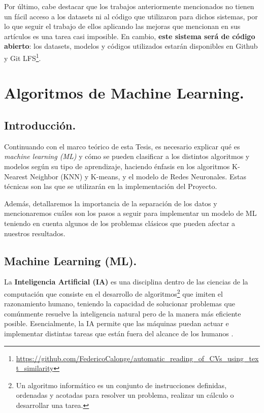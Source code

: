 \documentclass[12pt,a4paper]{article}
\begin{document}
\begin{sloppypar}
Por último, cabe destacar que los trabajos anteriormente mencionados no tienen un fácil acceso a los datasets ni al código que utilizaron para dichos sistemas, por lo que seguir el trabajo de ellos aplicando las mejoras que mencionan en sus artículos es una tarea casi imposible. En cambio, \textbf{este sistema será de código abierto}: los datasets, modelos y códigos utilizados estarán disponibles en Github y Git LFS\footnote{\url{https://github.com/FedericoCalonge/automatic_reading_of_CVs_using_text_similarity}}.

\cleardoublepage    %

\section{Algoritmos de Machine Learning.}\label{3.AlgoritmosdeMachineLearning}

\subsection{Introducción.}
Continuando con el marco teórico de esta Tesis, es necesario explicar qué es \textit{machine learning (ML)} y cómo se pueden clasificar a los distintos algoritmos y modelos según su tipo de aprendizaje, haciendo énfasis en los algoritmos K-Nearest Neighbor (KNN) y K-means, y el modelo de Redes Neuronales. Estas técnicas son las que se utilizarán en la implementación del Proyecto.

Además, detallaremos la importancia de la separación de los datos y mencionaremos cuáles son los pasos a seguir para implementar un modelo de ML teniendo en cuenta algunos de los problemas clásicos que pueden afectar a nuestros resultados.

\subsection{Machine Learning (ML).} 

La \textbf{Inteligencia Artificial (IA)} es una disciplina dentro de las ciencias de la computación que consiste en el desarrollo de algoritmos\footnote{Un algoritmo informático es un conjunto de instrucciones definidas, ordenadas y acotadas para resolver un problema, realizar un cálculo o desarrollar una tarea.} que imiten el razonamiento humano, teniendo la capacidad de solucionar problemas que comúnmente resuelve la inteligencia natural pero de la manera más eficiente posible. 
Esencialmente, la IA permite que las máquinas puedan actuar e implementar distintas tareas que están fuera del alcance de los humanos \cite{intro_algos_ML}.


\end{sloppypar}
\end{document}
